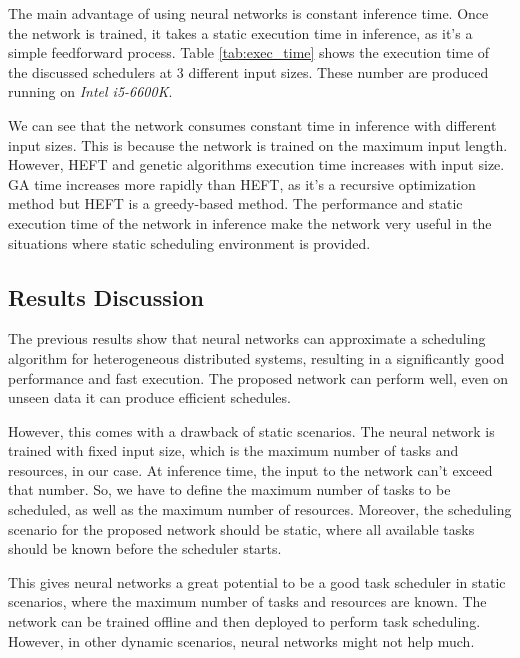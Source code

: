 The main advantage of using neural networks is constant inference time. Once the network is trained, it takes a static execution time in inference, as it's a simple feedforward process. Table \ref{tab:exec_time} shows the execution time of the discussed schedulers at 3 different input sizes. These number are produced running on \emph{Intel i5-6600K}. 

We can see that the network consumes constant time in inference with different input sizes. This is because the network is trained on the maximum input length. However, HEFT and genetic algorithms execution time increases with input size. GA time increases more rapidly than HEFT, as it's a recursive optimization method but HEFT is a greedy-based method. The performance and static execution time of the network in inference make the network very useful in the situations where static scheduling environment is provided.

\subsection{Results Discussion}
The previous results show that neural networks can approximate a scheduling algorithm for heterogeneous distributed systems, resulting in a significantly good performance and fast execution. The proposed network can perform well, even on unseen data it can produce efficient schedules.

However, this comes with a drawback of static scenarios. The neural network is trained with fixed input size, which is the maximum number of tasks and resources, in our case. At inference time, the input to the network can't exceed that number. So, we have to define the maximum number of tasks to be scheduled, as well as the maximum number of resources. Moreover, the scheduling scenario for the proposed network should be static, where all available tasks should be known before the scheduler starts. 

This gives neural networks a great potential to be a good task scheduler in static scenarios, where the maximum number of tasks and resources are known. The network can be trained offline and then deployed to perform task scheduling. However, in other dynamic scenarios, neural networks might not help much.